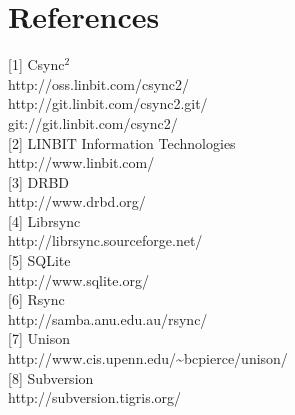 \documentclass[a4paper,twocolumn]{article}
\def\csync2{{\sc Csync$^{2}$}}
\begin{document}
\section{References}

{[1]} \csync2 \\
http://oss.linbit.com/csync2/ \\
http://git.linbit.com/csync2.git/ \\
git://git.linbit.com/csync2/
\medskip \\
{[2]} LINBIT Information Technologies \\
http://www.linbit.com/
\medskip \\
{[3]} DRBD \\
http://www.drbd.org/
\medskip \\
{[4]} Librsync \\
http://librsync.sourceforge.net/
\medskip \\
{[5]} SQLite \\
http://www.sqlite.org/
\medskip \\
{[6]} Rsync \\
http://samba.anu.edu.au/rsync/
\medskip \\
{[7]} Unison \\
http://www.cis.upenn.edu/\textasciitilde{}bcpierce/unison/
\medskip \\
{[8]} Subversion \\
http://subversion.tigris.org/
\end{document}
